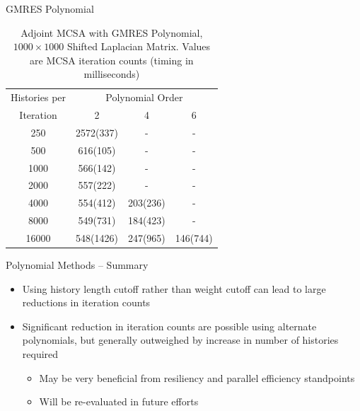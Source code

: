 \documentclass{beamer}
\begin{document}
\begin{frame}{GMRES Polynomial}
\begin{table}
\caption{Adjoint MCSA with GMRES Polynomial, $1000 \times 1000$ Shifted Laplacian Matrix.
Values are MCSA iteration counts (timing in milliseconds)
\label{tab:lap_adjoint_gmres}}
\centering
\begin{tabular}{cccc}
\toprule
Histories per & \multicolumn{3}{c}{Polynomial Order} \\
\cmidrule(lr){2-4}
Iteration & 2 & 4 & 6 \\
\midrule
250 &  2572(337) & - & - \\
500 &  616(105)  & - & - \\
1000 & 566(142)  &  - & - \\
2000 & 557(222)  &  - & - \\
4000 & 554(412)  &  203(236) & - \\
8000 & 549(731)  &  184(423) & - \\
16000 & 548(1426) & 247(965) & 146(744) \\
\bottomrule
\end{tabular}
\end{table}

\end{frame}
\begin{frame}{Polynomial Methods -- Summary}
  \begin{itemize}
    \item Using history length cutoff rather than weight cutoff can lead to
      large reductions in iteration counts
    \vfill
    \item Significant reduction in iteration counts are possible using
      alternate polynomials, but generally outweighed by increase in number
      of histories required
      \begin{itemize}
        \item May be very beneficial from resiliency and parallel efficiency
          standpoints
        \item Will be re-evaluated in future efforts
      \end{itemize}
  \end{itemize}
\end{frame}
\end{document}
